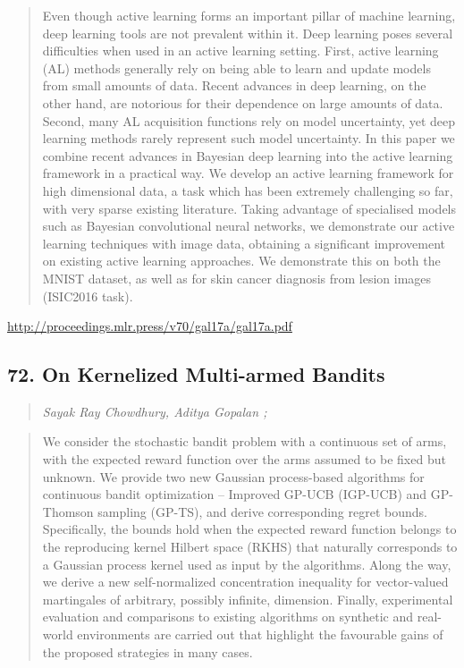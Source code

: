 \documentclass{article}
\begin{document}
\begin{quote}
    Even though active learning forms an important pillar of machine learning, deep learning tools are not prevalent within it. Deep learning poses several difficulties when used in an active learning setting. First, active learning (AL) methods generally rely on being able to learn and update models from small amounts of data. Recent advances in deep learning, on the other hand, are notorious for their dependence on large amounts of data. Second, many AL acquisition functions rely on model uncertainty, yet deep learning methods rarely represent such model uncertainty. In this paper we combine recent advances in Bayesian deep learning into the active learning framework in a practical way. We develop an active learning framework for high dimensional data, a task which has been extremely challenging so far, with very sparse existing literature. Taking advantage of specialised models such as Bayesian convolutional neural networks, we demonstrate our active learning techniques with image data, obtaining a significant improvement on existing active learning approaches. We demonstrate this on both the MNIST dataset, as well as for skin cancer diagnosis from lesion images (ISIC2016 task).  \end{quote}

\href{http://proceedings.mlr.press/v70/gal17a/gal17a.pdf}{http://proceedings.mlr.press/v70/gal17a/gal17a.pdf}

\subsection{72. On Kernelized Multi-armed Bandits}

\begin{quote}
\footnotesize{\textit{Sayak Ray Chowdhury, Aditya Gopalan ;}}
\end{quote}

\begin{quote}
    We consider the stochastic bandit problem with a continuous set of arms, with the expected reward function over the arms assumed to be fixed but unknown. We provide two new Gaussian process-based algorithms for continuous bandit optimization – Improved GP-UCB (IGP-UCB) and GP-Thomson sampling (GP-TS), and derive corresponding regret bounds. Specifically, the bounds hold when the expected reward function belongs to the reproducing kernel Hilbert space (RKHS) that naturally corresponds to a Gaussian process kernel used as input by the algorithms. Along the way, we derive a new self-normalized concentration inequality for vector-valued martingales of arbitrary, possibly infinite, dimension. Finally, experimental evaluation and comparisons to existing algorithms on synthetic and real-world environments are carried out that highlight the favourable gains of the proposed strategies in many cases.  \end{quote}
\end{document}
